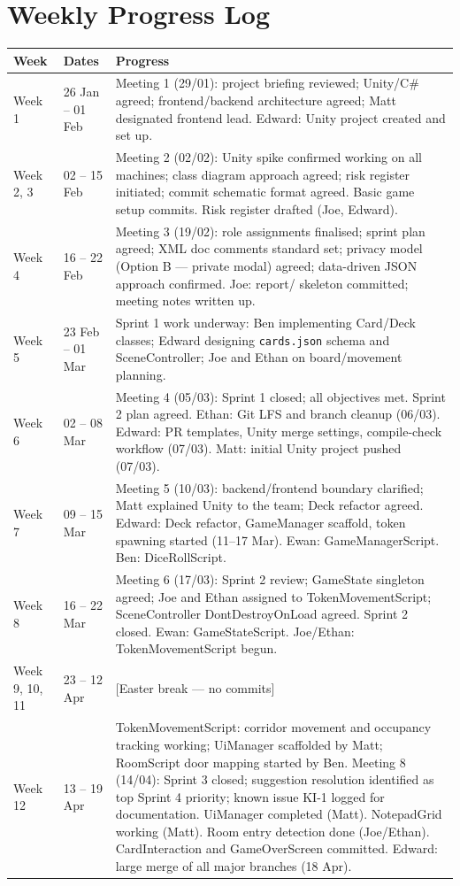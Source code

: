 \section{Weekly Progress Log}

\begin{longtable}{llp{10cm}}
\toprule
\textbf{Week} & \textbf{Dates} & \textbf{Progress} \\
\midrule
\endhead
Week 1 & 26 Jan -- 01 Feb & Meeting 1 (29/01): project briefing reviewed; Unity/C\# agreed; frontend/backend architecture agreed; Matt designated frontend lead. Edward: Unity project created and set up.  \\
Week 2, 3 & 02 -- 15 Feb & Meeting 2 (02/02): Unity spike confirmed working on all machines; class diagram approach agreed; risk register initiated; commit schematic format agreed. Basic game setup commits. Risk register drafted (Joe, Edward). \\
Week 4 & 16 -- 22 Feb & Meeting 3 (19/02): role assignments finalised; sprint plan agreed; XML doc comments standard set; privacy model (Option B --- private modal) agreed; data-driven JSON approach confirmed. Joe: report/ skeleton committed; meeting notes written up. \\
Week 5 & 23 Feb -- 01 Mar & Sprint 1 work underway: Ben implementing Card/Deck classes; Edward designing \texttt{cards.json} schema and SceneController; Joe and Ethan on board/movement planning. \\
Week 6 & 02 -- 08 Mar & Meeting 4 (05/03): Sprint 1 closed; all objectives met. Sprint 2 plan agreed. Ethan: Git LFS and branch cleanup (06/03). Edward: PR templates, Unity merge settings, compile-check workflow (07/03). Matt: initial Unity project pushed (07/03). \\
Week 7 & 09 -- 15 Mar & Meeting 5 (10/03): backend/frontend boundary clarified; Matt explained Unity to the team; Deck refactor agreed. Edward: Deck refactor, GameManager scaffold, token spawning started (11--17 Mar). Ewan: GameManagerScript. Ben: DiceRollScript. \\
Week 8 & 16 -- 22 Mar & Meeting 6 (17/03): Sprint 2 review; GameState singleton agreed; Joe and Ethan assigned to TokenMovementScript; SceneController DontDestroyOnLoad agreed. Sprint 2 closed. Ewan: GameStateScript. Joe/Ethan: TokenMovementScript begun. \\
Week 9, 10, 11 & 23 -- 12 Apr & [Easter break --- no commits] \\
Week 12 & 13 -- 19 Apr & TokenMovementScript: corridor movement and occupancy tracking working; UiManager scaffolded by Matt; RoomScript door mapping started by Ben. Meeting 8 (14/04): Sprint 3 closed; suggestion resolution identified as top Sprint 4 priority; known issue KI-1 logged for documentation. UiManager completed (Matt). NotepadGrid working (Matt). Room entry detection done (Joe/Ethan). CardInteraction and GameOverScreen committed. Edward: large merge of all major branches (18 Apr). \\

\end{longtable}
